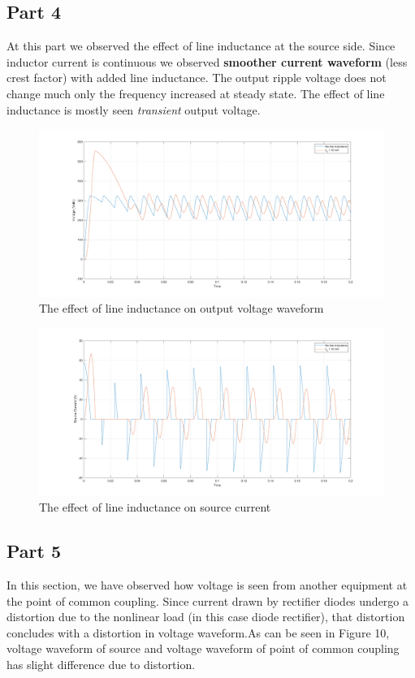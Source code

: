 \documentclass[fleqn, a4paper]{report}
\begin{document}
\subsection*{Part 4}
At this part we observed the effect of line inductance at the source side. Since inductor current is continuous we observed \textbf{smoother current waveform} (less crest factor) with added line inductance. The output ripple voltage does not change much only the frequency increased at steady state. The effect of line inductance is mostly seen \textit{transient} output voltage. 
\begin{figure}[H]
  \includegraphics[width=\linewidth]{part2d.png}
  \caption{The effect of line inductance on output voltage waveform}
  \label{fig:simulink3}
\end{figure}
\begin{figure}[H]
  \includegraphics[width=\linewidth]{part2d2.png}
  \caption{The effect of line inductance on source current}
  \label{fig:simulink3}
\end{figure}
\subsection*{Part 5}

In this section, we have observed how voltage is seen from another equipment at the point of common coupling. Since current drawn by rectifier diodes undergo a distortion due to the nonlinear load (in this case diode rectifier), that distortion concludes with a distortion in voltage waveform.As can be seen in Figure 10, voltage waveform of source and voltage waveform of point of common coupling has slight difference due to distortion. 
\end{document}
